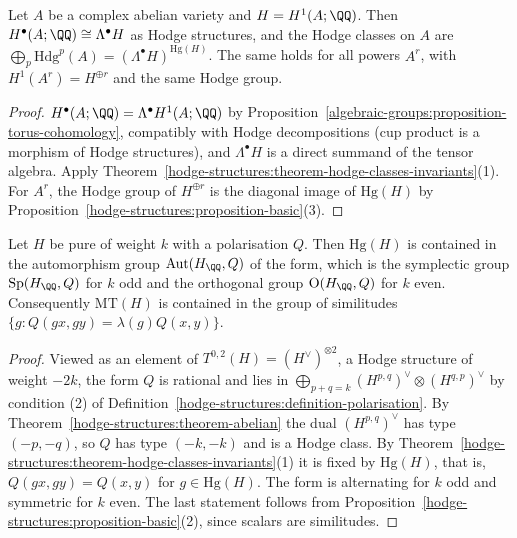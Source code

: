 \begin{corollary}\label{hodge-structures:corollary-hodge-ring-abelian}
Let $A$ be a complex abelian variety and $H = H^1(A; \QQ)$. Then $H^\bullet(A; \QQ) \cong \Lambda^\bullet H$ as Hodge structures, and the Hodge classes on $A$ are
$\bigoplus_p\mathrm{Hdg}^p(A) = (\Lambda^\bullet H)^{\mathrm{Hg}(H)}$. The same holds for all powers $A^r$, with $H^1(A^r) = H^{\oplus r}$ and the same Hodge group.
\end{corollary}

\begin{proof}
$H^\bullet(A; \QQ) = \Lambda^\bullet H^1(A; \QQ)$ by Proposition~\ref{algebraic-groups:proposition-torus-cohomology}, compatibly with Hodge decompositions (cup product is a morphism of Hodge
structures), and $\Lambda^\bullet H$ is a direct summand of the tensor algebra. Apply Theorem~\ref{hodge-structures:theorem-hodge-classes-invariants}(1). For $A^r$, the Hodge group of $H^{\oplus r}$ is the
diagonal image of $\mathrm{Hg}(H)$ by Proposition~\ref{hodge-structures:proposition-basic}(3).
\end{proof}

\begin{proposition}\label{hodge-structures:proposition-polarisation}
Let $H$ be pure of weight $k$ with a polarisation $Q$. Then $\mathrm{Hg}(H)$ is contained in the automorphism group $\mathrm{Aut}(H_\QQ, Q)$ of the form, which is the symplectic group $\mathrm{Sp}(H_\QQ, Q)$ for $k$ odd and
the orthogonal group $\mathrm{O}(H_\QQ, Q)$ for $k$ even. Consequently $\mathrm{MT}(H)$ is contained in the group of similitudes $\{g : Q(gx, gy) = \lambda(g)Q(x, y)\}$.
\end{proposition}

\begin{proof}
Viewed as an element of $T^{0,2}(H) = (H^\vee)^{\otimes 2}$, a Hodge structure of weight $-2k$, the form $Q$ is rational and lies in $\bigoplus_{p+q=k}(H^{p,q})^\vee \otimes (H^{q,p})^\vee$ by condition (2) of
Definition~\ref{hodge-structures:definition-polarisation}. By Theorem~\ref{hodge-structures:theorem-abelian} the dual $(H^{p,q})^\vee$ has type $(-p,-q)$, so $Q$ has type $(-k, -k)$ and is a Hodge class. By
Theorem~\ref{hodge-structures:theorem-hodge-classes-invariants}(1) it is fixed by $\mathrm{Hg}(H)$, that is, $Q(gx, gy) = Q(x, y)$ for $g \in \mathrm{Hg}(H)$. The form is alternating for $k$ odd and symmetric for $k$ even. The
last statement follows from Proposition~\ref{hodge-structures:proposition-basic}(2), since scalars are similitudes.
\end{proof}

